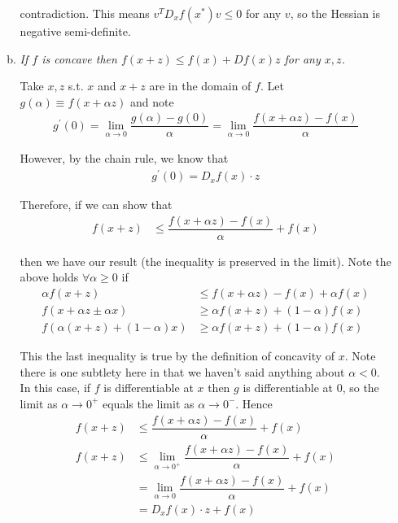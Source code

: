 \documentclass{article}
\begin{document}
\begin{enumerate}[1.]
\begin{enumerate}[a)]
        contradiction. This means $v^T D_x f(x^*) v \le 0$ for any $v$, so the Hessian is negative semi-definite.

      \item \textit{If $f$ is concave then $f(x + z) \le f(x) + Df(x) z$ for any $x, z$.}

        \solution Take $x, z$ s.t. $x$ and $x + z$ are in the domain of $f$. Let $g(\alpha) \equiv f(x + \alpha z)$ and note
          \begin{align*}
            g^\prime(0)
            =
            \lim_{\alpha \to 0}
            \dfrac{g(\alpha) - g(0)}{\alpha}
            =
            \lim_{\alpha \to 0}
            \dfrac{f(x + \alpha z) - f(x)}{\alpha}
          \end{align*}

          However, by the chain rule, we know that
          \begin{align*}
            g^\prime(0)
            =
            D_x f(x) \cdot z
          \end{align*}

          Therefore, if we can show that
          \begin{align*}
            f(x + z)
            &
            \le
            \dfrac{f(x + \alpha z) - f(x)}{\alpha} + f(x)
          \end{align*}

          then we have our result (the inequality is preserved in the limit). Note the above holds $\forall \alpha \ge 0$ if
          \begin{align*}
            \alpha f(x + z)
            &
            \le
            f(x + \alpha z) - f(x) + \alpha f(x)
            \\
            f(x + \alpha z \pm \alpha x)
            &
            \ge
            \alpha f(x + z) + (1 - \alpha) f(x)
            \\
            f(\alpha (x + z) + (1 - \alpha) x)
            &
            \ge
            \alpha f(x + z) + (1 - \alpha) f(x)
          \end{align*}

          This the last inequality is true by the definition of concavity of $x$. Note there is one subtlety here in that we haven't said anything about $\alpha < 0$. In this case, if $f$ is differentiable at $x$ then $g$ is differentiable at $0$, so the limit as $\alpha \to 0^+$ equals the limit as $\alpha \to 0^-$. Hence
          \begin{align*}
            f(x + z)
            &
            \le
            \dfrac{f(x + \alpha z) - f(x)}{\alpha} + f(x)
            \\
            f(x + z)
            &
            \le
            \lim_{\alpha \to 0^+}
            \dfrac{f(x + \alpha z) - f(x)}{\alpha} + f(x)
            \\
            &
            =
            \lim_{\alpha \to 0}
            \dfrac{f(x + \alpha z) - f(x)}{\alpha} + f(x)
            \\
            &
            =
            D_x f(x) \cdot z + f(x)
          \end{align*}


\end{enumerate}
\end{enumerate}
\end{document}
